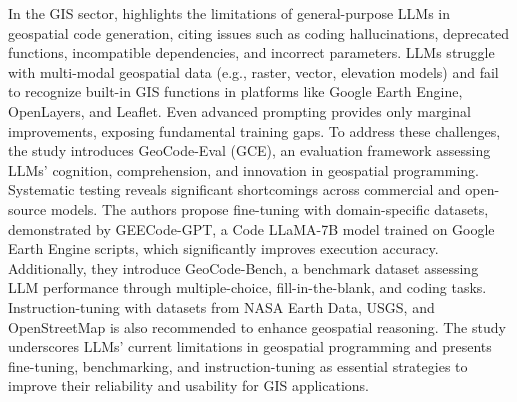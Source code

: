 In the GIS sector, \citet{hou2024can} highlights the limitations of general-purpose LLMs in geospatial code generation, citing issues such as coding hallucinations, deprecated functions, incompatible dependencies, and incorrect parameters. LLMs struggle with multi-modal geospatial data (e.g., raster, vector, elevation models) and fail to recognize built-in GIS functions in platforms like Google Earth Engine, OpenLayers, and Leaflet. Even advanced prompting provides only marginal improvements, exposing fundamental training gaps. To address these challenges, the study introduces GeoCode-Eval (GCE), an evaluation framework assessing LLMs' cognition, comprehension, and innovation in geospatial programming. Systematic testing reveals significant shortcomings across commercial and open-source models. The authors propose fine-tuning with domain-specific datasets, demonstrated by GEECode-GPT, a Code LLaMA-7B model trained on Google Earth Engine scripts, which significantly improves execution accuracy. Additionally, they introduce GeoCode-Bench, a benchmark dataset assessing LLM performance through multiple-choice, fill-in-the-blank, and coding tasks. Instruction-tuning with datasets from NASA Earth Data, USGS, and OpenStreetMap is also recommended to enhance geospatial reasoning. The study underscores LLMs' current limitations in geospatial programming and presents fine-tuning, benchmarking, and instruction-tuning as essential strategies to improve their reliability and usability for GIS applications.

